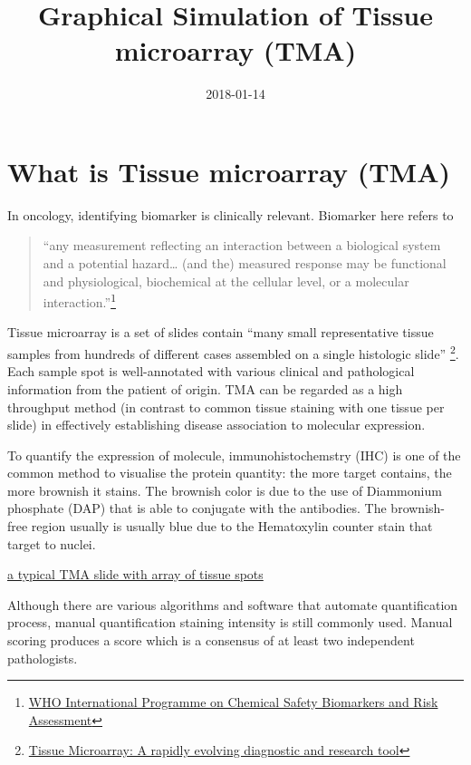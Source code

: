 \documentclass[]{article}
\title{Graphical Simulation of Tissue microarray (TMA)}
\author{}
\date{2018-01-14}
\let\rmarkdownfootnote\footnote%
\def\footnote{\protect\rmarkdownfootnote}
\begin{document}
\maketitle

\hypertarget{what-is-tissue-microarray-tma}{%
\section{What is Tissue microarray
(TMA)}\label{what-is-tissue-microarray-tma}}

In oncology, identifying biomarker is clinically relevant. Biomarker
here refers to

\begin{quote}
``any measurement reflecting an interaction between a biological system
and a potential hazard\ldots{} (and the) measured response may be
functional and physiological, biochemical at the cellular level, or a
molecular interaction.''\footnote{\href{http://www.inchem.org/documents/ehc/ehc/ehc155.htm}{WHO
  International Programme on Chemical Safety Biomarkers and Risk
  Assessment}}
\end{quote}

Tissue microarray is a set of slides contain ``many small representative
tissue samples from hundreds of different cases assembled on a single
histologic slide'' \footnote{\href{https://www.ncbi.nlm.nih.gov/pmc/articles/PMC2813639/}{Tissue
  Microarray: A rapidly evolving diagnostic and research tool}}. Each
sample spot is well-annotated with various clinical and pathological
information from the patient of origin. TMA can be regarded as a high
throughput method (in contrast to common tissue staining with one tissue
per slide) in effectively establishing disease association to molecular
expression.

To quantify the expression of molecule, immunohistochemstry (IHC) is one
of the common method to visualise the protein quantity: the more target
contains, the more brownish it stains. The brownish color is due to the
use of Diammonium phosphate (DAP) that is able to conjugate with the
antibodies. The brownish-free region usually is usually blue due to the
Hematoxylin counter stain that target to nuclei.

\href{/tma.jpg}{a typical TMA slide with array of tissue spots}

Although there are various algorithms and software that automate
quantification process, manual quantification staining intensity is
still commonly used. Manual scoring produces a score which is a
consensus of at least two independent pathologists.
\end{document}
